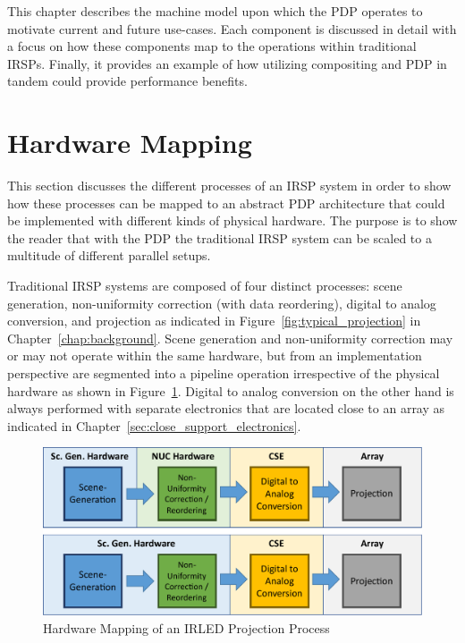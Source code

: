 \label{chap:machine_model}
This chapter describes the machine model upon which the PDP operates to motivate current and future use-cases. Each component is discussed in detail with a focus on how these components map to the operations within traditional IRSPs. Finally, it provides an example of how utilizing compositing and PDP in tandem could provide performance benefits.

\section{Hardware Mapping}
    This section discusses the different processes of an IRSP system in order to show how these processes can be mapped to an abstract PDP architecture that could be implemented with different kinds of physical hardware. The purpose is to show the reader that with the PDP the traditional IRSP system can be scaled to a multitude of different parallel setups.

    Traditional IRSP systems are composed of four distinct processes: scene generation, non-uniformity correction (with data reordering), digital to analog conversion, and projection as indicated in Figure~\ref{fig:typical_projection} in Chapter~\ref{chap:background}. Scene generation and non-uniformity correction may or may not operate within the same hardware, but from an implementation perspective are segmented into a pipeline operation irrespective of the physical hardware as shown in Figure~\ref{fig:typical_projection_hardware}. Digital to analog conversion on the other hand is always performed with separate electronics that are located close to an array as indicated in Chapter~\ref{sec:close_support_electronics}.

    \begin{figure}
        \centering
        \includegraphics[width=1.0\textwidth]{fig/typical_projection_system_hardware.pdf}
        \caption{Hardware Mapping of an IRLED Projection Process}
        \label{fig:typical_projection_hardware}
    \end{figure}

